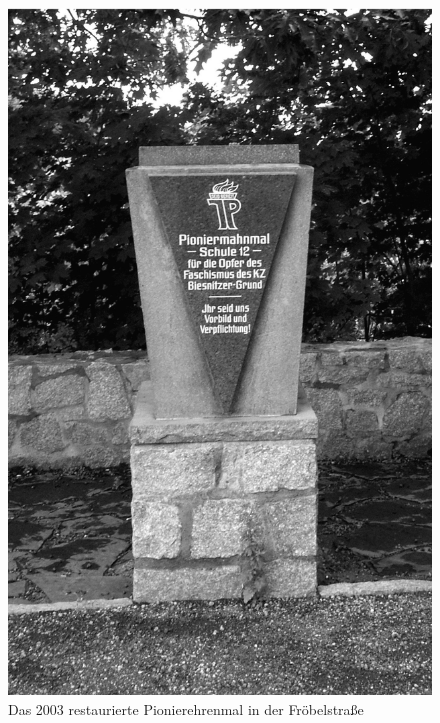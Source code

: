 \begin{figure}[htb]
    \centering
    \begin{minipage}[t]{0.47\linewidth}
        \includegraphics[width=\linewidth]{images/nk04}
        \caption{Das 2003 restaurierte Pionierehrenmal in der Fröbelstraße}
        \label{froebel}
    \end{minipage}
    \hfill
    \begin{minipage}[t]{0.47\linewidth}

\end{minipage}
\end{figure}
